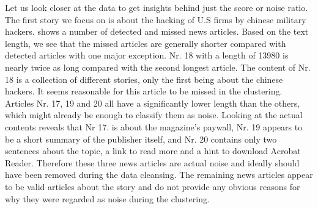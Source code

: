 Let us look closer at the data to get insights behind just the score or noise ratio.
The first story we focus on is about the hacking of U.S firms by chinese military hackers.
 shows a number of detected and missed news articles.
Based on the text length, we see that the missed articles are generally shorter compared with detected articles with one major exception.
Nr. 18 with a length of 13980 is nearly twice as long compared with the second longest article.
The content of Nr. 18 is a collection of different stories, only the first being about the chinese hackers.
It seems reasonable for this article to be missed in the clustering.
Articles Nr. 17, 19 and 20 all have a significantly lower length than the others,
which might already be enough to classify them as noise.
Looking at the actual contents reveals that Nr 17. is about the magazine's paywall,
Nr. 19 appears to be a short summary of the publisher itself, and Nr. 20 contains only two sentences about the topic,
a link to read more and a hint to download Acrobat Reader.
Therefore these three news articles are actual noise and ideally should have been removed during the data cleansing.
The remaining news articles appear to be valid articles about the story
and do not provide any obvious reasons for why they were regarded as noise during the clustering.

